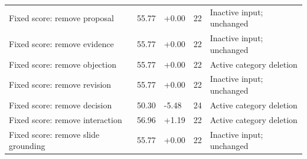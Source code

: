 \documentclass[journal]{IEEEtran}
\begin{document}
\begin{table}[t]
\begin{tabular}{p{}p{}p{}p{}p{}}
{\raggedright Fixed score: remove proposal\par} & {\raggedright 55.77\par} & {\raggedright +0.00\par} & {\raggedright 22\par} & {\raggedright Inactive input; unchanged\par} \\
{\raggedright Fixed score: remove evidence\par} & {\raggedright 55.77\par} & {\raggedright +0.00\par} & {\raggedright 22\par} & {\raggedright Inactive input; unchanged\par} \\
{\raggedright Fixed score: remove objection\par} & {\raggedright 55.77\par} & {\raggedright +0.00\par} & {\raggedright 22\par} & {\raggedright Active category deletion\par} \\
{\raggedright Fixed score: remove revision\par} & {\raggedright 55.77\par} & {\raggedright +0.00\par} & {\raggedright 22\par} & {\raggedright Inactive input; unchanged\par} \\
{\raggedright Fixed score: remove decision\par} & {\raggedright 50.30\par} & {\raggedright -5.48\par} & {\raggedright 24\par} & {\raggedright Active category deletion\par} \\
{\raggedright Fixed score: remove interaction\par} & {\raggedright 56.96\par} & {\raggedright +1.19\par} & {\raggedright 22\par} & {\raggedright Active category deletion\par} \\
{\raggedright Fixed score: remove slide grounding\par} & {\raggedright 55.77\par} & {\raggedright +0.00\par} & {\raggedright 22\par} & {\raggedright Inactive input; unchanged\par} \\
\bottomrule
\end{tabular}
\end{table}
\end{document}
